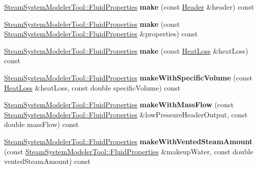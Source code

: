 \begin{DoxyCompactItemize}
\hyperlink{struct_steam_system_modeler_tool_1_1_fluid_properties}{Steam\+System\+Modeler\+Tool\+::\+Fluid\+Properties} {\bfseries make} (const \hyperlink{class_header}{Header} \&header) const
\item 
\mbox{\label{class_fluid_properties_factory_ad4f3d4504e5c46fe39da14ac5035291a}} 
\hyperlink{struct_steam_system_modeler_tool_1_1_fluid_properties}{Steam\+System\+Modeler\+Tool\+::\+Fluid\+Properties} {\bfseries make} (const \hyperlink{struct_steam_system_modeler_tool_1_1_fluid_properties}{Steam\+System\+Modeler\+Tool\+::\+Fluid\+Properties} \&properties) const
\item 
\mbox{\label{class_fluid_properties_factory_a6222ece1469cd7b208a90bd65702b431}} 
\hyperlink{struct_steam_system_modeler_tool_1_1_fluid_properties}{Steam\+System\+Modeler\+Tool\+::\+Fluid\+Properties} {\bfseries make} (const \hyperlink{class_heat_loss}{Heat\+Loss} \&heat\+Loss) const
\item 
\mbox{\label{class_fluid_properties_factory_a37d6381e37993134fbbb26436f07cf27}} 
\hyperlink{struct_steam_system_modeler_tool_1_1_fluid_properties}{Steam\+System\+Modeler\+Tool\+::\+Fluid\+Properties} {\bfseries make\+With\+Specific\+Volume} (const \hyperlink{class_heat_loss}{Heat\+Loss} \&heat\+Loss, const double specific\+Volume) const
\item 
\mbox{\label{class_fluid_properties_factory_a7371b3ddc062eaa2d15ff003fd1d1faa}} 
\hyperlink{struct_steam_system_modeler_tool_1_1_fluid_properties}{Steam\+System\+Modeler\+Tool\+::\+Fluid\+Properties} {\bfseries make\+With\+Mass\+Flow} (const \hyperlink{struct_steam_system_modeler_tool_1_1_fluid_properties}{Steam\+System\+Modeler\+Tool\+::\+Fluid\+Properties} \&low\+Pressure\+Header\+Output, const double mass\+Flow) const
\item 
\mbox{\label{class_fluid_properties_factory_aae22a8312f9eed7130e5178a1556a776}} 
\hyperlink{struct_steam_system_modeler_tool_1_1_fluid_properties}{Steam\+System\+Modeler\+Tool\+::\+Fluid\+Properties} {\bfseries make\+With\+Vented\+Steam\+Amount} (const \hyperlink{struct_steam_system_modeler_tool_1_1_fluid_properties}{Steam\+System\+Modeler\+Tool\+::\+Fluid\+Properties} \&makeup\+Water, const double vented\+Steam\+Amount) const

\end{DoxyCompactItemize}
